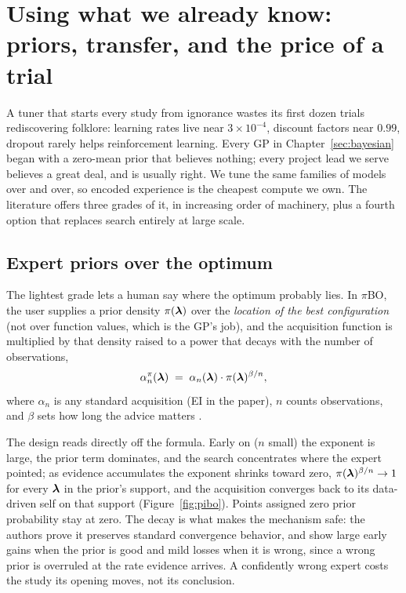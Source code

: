 \chapter{Using what we already know: priors, transfer, and the price of a trial}
\label{sec:transfer}

A tuner that starts every study from ignorance wastes its first dozen trials
rediscovering folklore: learning rates live near $3 \times 10^{-4}$, discount
factors near $0.99$, dropout rarely helps reinforcement learning. Every GP in
Chapter~\ref{sec:bayesian} began with a zero-mean prior that believes
nothing; every project lead we serve believes a great deal, and is usually
right. We tune the same families of models over and over, so encoded
experience is the cheapest compute we own. The literature offers three
grades of it, in increasing order of machinery, plus a fourth option that
replaces search entirely at large scale.

\section{Expert priors over the optimum}

The lightest grade lets a human say where the optimum probably lies. In
$\pi$BO, the user supplies a prior density $\pi(\bm{\lambda})$ over the
\emph{location of the best configuration} (not over function values, which
is the GP's job), and the acquisition function is multiplied by that
density raised to a power that decays with the number of observations,
\begin{equation}
\alpha_n^{\pi}(\bm{\lambda})
\;=\; \alpha_n(\bm{\lambda}) \cdot \pi(\bm{\lambda})^{\beta / n},
\label{eq:pibo}
\end{equation}
where $\alpha_n$ is any standard acquisition (EI in the paper), $n$ counts
observations, and $\beta$ sets how long the advice matters
\citep{hvarfner2022pibo}.

The design reads directly off the formula. Early
on ($n$ small) the exponent is large, the prior term dominates, and the
search concentrates where the expert pointed; as evidence accumulates the
exponent shrinks toward zero, $\pi(\bm{\lambda})^{\beta/n} \to 1$ for every
$\bm{\lambda}$ in the prior's support, and the acquisition converges back to
its data-driven self on that support (Figure~\ref{fig:pibo}). Points
assigned zero prior probability stay at zero. The decay is what makes
the mechanism safe: the authors prove it preserves standard convergence
behavior, and show large early gains when the prior is good and mild
losses when it is wrong, since a wrong prior is overruled at the rate
evidence arrives. A confidently wrong expert costs the study its opening
moves, not its conclusion.

